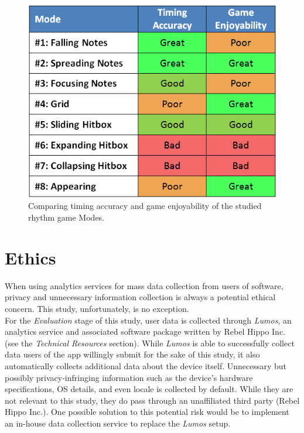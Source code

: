 \documentclass{sig-alternate}
\begin{document}
\begin{figure}[htb!]
	\begin{center}
		\includegraphics[width=1\linewidth]{figure_chart_results}
	\end{center}
	\vspace{-12pt}
	\caption{Comparing timing accuracy and game enjoyability of the studied rhythm game Modes.}
	\label{fig:chart_results}
\end{figure}

\section{Ethics}
\label{sec:ethics}
When using analytics services for mass data collection from users of software, privacy and unnecessary information collection is always a potential ethical concern. This study, unfortunately, is no exception. \\

For the \textit{Evaluation} stage of this study, user data is collected through \textit{Lumos}, an analytics service and associated software package written by Rebel Hippo Inc. (see the \textit{Technical Resources} section). While \textit{Lumos} is able to successfully collect data users of the app willingly submit for the sake of this study, it also automatically collects additional data about the device itself. Unnecessary but possibly privacy-infringing information such as the device's hardware specifications, OS details, and even locale is collected by default. While they are not relevant to this study, they do pass through an unaffiliated third party (Rebel Hippo Inc.). One possible solution to this potential risk would be to implement an in-house data collection service to replace the \textit{Lumos} setup.
\end{document}
